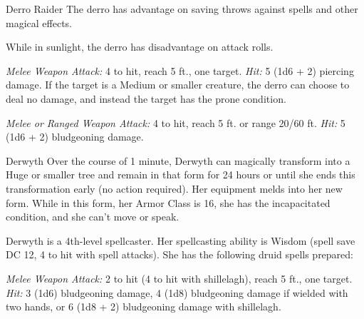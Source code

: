 \documentclass[10pt,a4paper,twoside,bg=print,twocolumn,openany,nodeprecatedcode]{dndbook}
\begin{document}
\begin{DndMonster}[float=t]{Derro Raider}
\DndMonsterBasics[
armor-class = {12 (\textit{leather armor})},
hit-points = {\DndDice{3d6 + 6}},
speed = {30 ft.}
]
\DndMonsterAbilityScores[
 str = 14,
 dex = 12,
 con = 14,
 int = 11,
 wis = 5,
 cha = 9
]
\DndMonsterDetails[
skills = {Athletics +4, Stealth +3},
senses = {darkvision 120 ft., passive perception 7},
languages = {Dwarvish, Undercommon},
challenge = 1/4,
]
The derro has advantage on saving throws against spells and other magical effects.

While in sunlight, the derro has disadvantage on attack rolls.

\textsl{Melee Weapon Attack:} 4 to hit, reach 5 ft., one target. \textsl{Hit:} 5 (1d6 + 2) piercing damage. If the target is a Medium or smaller creature, the derro can choose to deal no damage, and instead the target has the prone condition.

\textsl{Melee or Ranged Weapon Attack:} 4 to hit, reach 5 ft. or range 20/60 ft. \textsl{Hit:} 5 (1d6 + 2) bludgeoning damage.

\end{DndMonster}



\begin{DndMonster}[float=t]{Derwyth}
\DndMonsterBasics[
armor-class = {11 (16 with \textit{barkskin})},
hit-points = {\DndDice{5d8 + 5}},
speed = {30 ft.}
]
\DndMonsterAbilityScores[
 str = 10,
 dex = 12,
 con = 13,
 int = 12,
 wis = 15,
 cha = 11
]
\DndMonsterDetails[
skills = {Medicine +4, Nature +3, Perception +4},
senses = {darkvision 60, passive perception 14},
languages = {Common, Elvish},
challenge = 2,
]
Over the course of 1 minute, Derwyth can magically transform into a Huge or smaller tree and remain in that form for 24 hours or until she ends this transformation early (no action required). Her equipment melds into her new form. While in this form, her Armor Class is 16, she has the incapacitated condition, and she can't move or speak.

Derwyth is a 4th-level spellcaster. Her spellcasting ability is Wisdom (spell save DC 12, 4 to hit with spell attacks). She has the following druid spells prepared:
\begin{DndMonsterSpells}
\end{DndMonsterSpells}
\textsl{Melee Weapon Attack:} 2 to hit (4 to hit with shillelagh), reach 5 ft., one target. \textsl{Hit:} 3 (1d6) bludgeoning damage, 4 (1d8) bludgeoning damage if wielded with two hands, or 6 (1d8 + 2) bludgeoning damage with shillelagh.

\end{DndMonster}
\end{document}
